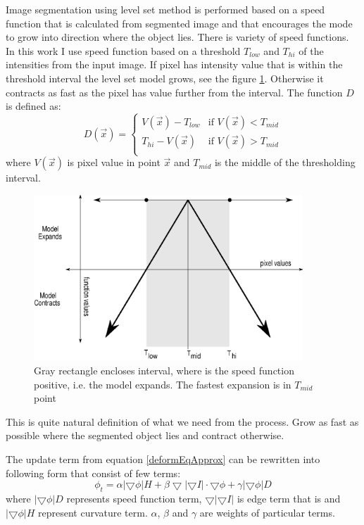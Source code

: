 Image segmentation using level set method is performed based on a speed function that is calculated from segmented image and that encourages the mode to grow into direction where the object lies.
There is variety of speed functions.
In this work I use speed function based on a threshold $T_{low}$ and $T_{hi}$ of the intensities from the input image.
If pixel has intensity value that is within the threshold interval the level set model grows, see the figure \ref{fg:speedFunction}.
Otherwise it contracts as fast as the pixel has value further from the interval.
The function $D$ is defined as:
\begin{equation}
\label{eq:speedFunction}
D(\vec{x}) =
\begin{cases}
V(\vec{x}) - T_{low} & \text{if $V(\vec{x}) < T_{mid}$}\\
T_{hi} - V(\vec{x}) & \text{if $V(\vec{x}) > T_{mid}$}\\
\end{cases}
\end{equation}
where $V(\vec{x})$ is pixel value in point $\vec{x}$ and $T_{mid}$ is the middle of the thresholding interval.

\begin{figure}
    \centering
    \includegraphics[width=0.9\textwidth]{data/speedFunction}
    \caption[Graph of thresholding based speed function]
    {
      Gray rectangle encloses interval, where is the speed function positive, i.e. the model expands.
      The fastest expansion is in $T_{mid}$ point
    }
    \label{fg:speedFunction}
\end{figure}

This is quite natural definition of what we need from the process.
Grow as fast as possible where the segmented object lies and contract otherwise.

The update term from equation \ref{deformEqApprox} can be rewritten into following form that consist of few terms:
\begin{equation}
\phi_t = \alpha |\bigtriangledown \phi| H + \beta
\bigtriangledown|\bigtriangledown I|\cdot \bigtriangledown \phi +
\gamma|\bigtriangledown \phi|D
\end{equation}
where $|\bigtriangledown \phi|D$ represents speed function term, $\bigtriangledown|\bigtriangledown I|$ is edge term that is and $|\bigtriangledown \phi| H$ represent curvature term. $\alpha$, $\beta$ and $\gamma$ are weights of particular terms.

